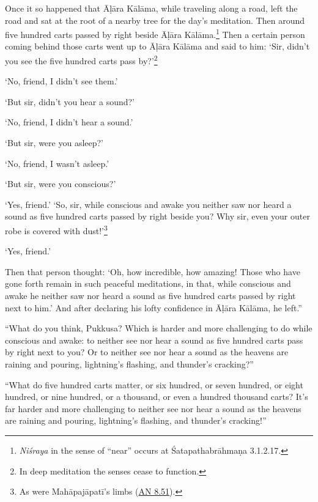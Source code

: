 \documentclass[12pt,openany]{book}%
\begin{document}
Once it so happened that \textsanskrit{Āḷāra} \textsanskrit{Kālāma}, while traveling along a road, left the road and sat at the root of a nearby tree for the day’s meditation. Then around five hundred carts passed by right beside \textsanskrit{Āḷāra} \textsanskrit{Kālāma}.\footnote{\textit{\textsanskrit{Niśraya}} in the sense of “near” occurs at \textsanskrit{Śatapathabrāhmaṇa} 3.1.2.17. } Then a certain person coming behind those carts went up to \textsanskrit{Āḷāra} \textsanskrit{Kālāma} and said to him: ‘Sir, didn’t you see the five hundred carts pass by?’\footnote{In deep meditation the senses cease to function. } 

‘No, friend, I didn’t see them.’ 

‘But sir, didn’t you hear a sound?’ 

‘No, friend, I didn’t hear a sound.’ 

‘But sir, were you asleep?’ 

‘No, friend, I wasn’t asleep.’ 

‘But sir, were you conscious?’ 

‘Yes, friend.’ ‘So, sir, while conscious and awake you neither saw nor heard a sound as five hundred carts passed by right beside you? Why sir, even your outer robe is covered with dust!’\footnote{As were \textsanskrit{Mahāpajāpatī}’s limbs (\href{https://suttacentral.net/an8.51/en/sujato}{AN 8.51}). } 

‘Yes, friend.’ 

Then that person thought: ‘Oh, how incredible, how amazing! Those who have gone forth remain in such peaceful meditations, in that, while conscious and awake he neither saw nor heard a sound as five hundred carts passed by right next to him.’ And after declaring his lofty confidence in \textsanskrit{Āḷāra} \textsanskrit{Kālāma}, he left.” 

“What do you think, Pukkusa? Which is harder and more challenging to do while conscious and awake: to neither see nor hear a sound as five hundred carts pass by right next to you? Or to neither see nor hear a sound as the heavens are raining and pouring, lightning’s flashing, and thunder’s cracking?” 

“What do five hundred carts matter, or six hundred, or seven hundred, or eight hundred, or nine hundred, or a thousand, or even a hundred thousand carts? It’s far harder and more challenging to neither see nor hear a sound as the heavens are raining and pouring, lightning’s flashing, and thunder’s cracking!” 
\end{document}
